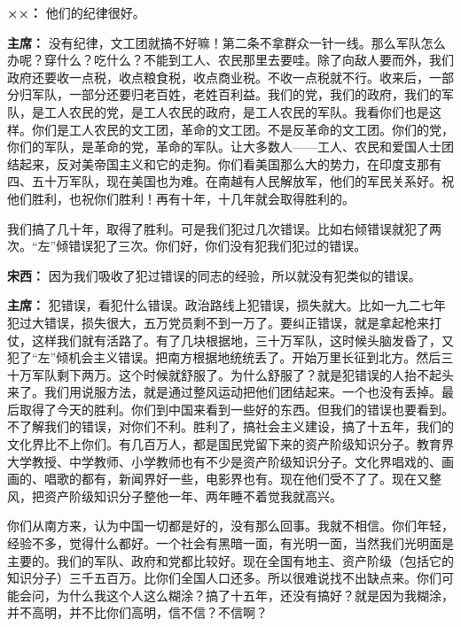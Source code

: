 \begin{list}{}
\item[\textbf{××：}] 他们的纪律很好。

\item[\textbf{主席：}] 没有纪律，文工团就搞不好嘛！第二条不拿群众一针一线。那么军队怎么办呢？穿什么？吃什么？不能到工人、农民那里去要哇。除了向敌人要而外，我们政府还要收一点税，收点粮食税，收点商业税。不收一点税就不行。收来后，一部分归军队，一部分还要归老百姓，老姓百利益。我们的党，我们的政府，我们的军队，是工人农民的党，是工人农民的政府，是工人农民的军队。我看你们也是这样。你们是工人农民的文工团，革命的文工团。不是反革命的文工团。你们的党，你们的军队，是革命的党，革命的军队。让大多数人——工人、农民和爱国人士团结起来，反对美帝国主义和它的走狗。你们看美国那么大的势力，在印度支那有四、五十万军队，现在美国也为难。在南越有人民解放军，他们的军民关系好。祝他们胜利，也祝你们胜利！再有十年，十几年就会取得胜利的。

我们搞了几十年，取得了胜利。可是我们犯过几次错误。比如右倾错误就犯了两次。“左”倾错误犯了三次。你们好，你们没有犯我们犯过的错误。

\item[\textbf{宋西：}] 因为我们吸收了犯过错误的同志的经验，所以就没有犯类似的错误。

\item[\textbf{主席：}] 犯错误，看犯什么错误。政治路线上犯错误，损失就大。比如一九二七年犯过大错误，损失很大，五万党员剩不到一万了。要纠正错误，就是拿起枪来打仗，这样我们就有活路了。有了几块根据地，三十万军队，这时候头脑发昏了，又犯了“左”倾机会主义错误。把南方根据地统统丢了。开始万里长征到北方。然后三十万军队剩下两万。这个时候就舒服了。为什么舒服了？就是犯错误的人抬不起头来了。我们用说服方法，就是通过整风运动把他们团结起来。一个也没有丢掉。最后取得了今天的胜利。你们到中国来看到一些好的东西。但我们的错误也要看到。不了解我们的错误，对你们不利。胜利了，搞社会主义建设，搞了十五年，我们的文化界比不上你们。有几百万人，都是国民党留下来的资产阶级知识分子。教育界大学教授、中学教师、小学教师也有不少是资产阶级知识分子。文化界唱戏的、画画的、唱歌的都有，新闻界好一些，电影界也有。现在他们受不了了。现在又整风，把资产阶级知识分子整他一年、两年睡不着觉我就高兴。

你们从南方来，认为中国一切都是好的，没有那么回事。我就不相信。你们年轻，经验不多，觉得什么都好。一个社会有黑暗一面，有光明一面，当然我们光明面是主要的。我们的军队、政府和党都比较好。现在全国有地主、资产阶级（包括它的知识分子）三千五百万。比你们全国人口还多。所以很难说找不出缺点来。你们可能会问，为什么我这个人这么糊涂？搞了十五年，还没有搞好？就是因为我糊涂，并不高明，并不比你们高明，信不信？不信啊？


\end{list}
